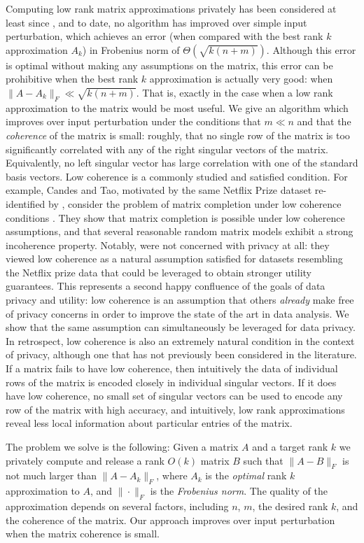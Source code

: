\documentclass[letterpaper,11pt]{article}
\theoremstyle{definition}
\begin{document}
Computing low rank matrix approximations privately has been considered at
least since \cite{BlumDMN05}, and to date, no algorithm has improved over simple
input  perturbation, which achieves an error (when compared with the best rank
$k$ approximation $A_k$) in Frobenius norm of $\Theta(\sqrt{k(n + m)})$. Although this error is optimal without making any assumptions on the matrix, this
error can be prohibitive when the best rank $k$ approximation is actually very
good: when $\|A-A_k\|_F \ll \sqrt{k(n+m)}.$ That is, exactly in the case when a
low rank approximation to the matrix would be most useful.  We give an
algorithm which improves over input perturbation under the conditions that $m
\ll n$ and that the \emph{coherence} of the matrix is small: roughly, that no
single row of the matrix is too significantly correlated with any of the right singular
vectors of the matrix. Equivalently, no left singular vector has large
correlation with one of the standard basis vectors. Low coherence is a
commonly studied and satisfied condition. For example, Candes and Tao,
motivated by the same Netflix Prize dataset re-identified by
\cite{NarayananS08}, consider the problem of matrix completion under low
coherence conditions \cite{CandesT10}. They show that matrix completion is
possible under low coherence assumptions, and that several reasonable random
matrix models exhibit a strong incoherence property.  Notably, \cite{CandesT10}
were not concerned with privacy at all: they viewed low coherence as a natural
assumption satisfied for datasets resembling the Netflix prize data that could
be leveraged to obtain stronger utility guarantees. This represents a second
happy confluence of the goals of data privacy and utility: low coherence is an
assumption that others \emph{already} make free of privacy concerns
in order to improve the state of the art in data analysis.  We show that the
same assumption can simultaneously be leveraged for data privacy. In
retrospect, low coherence is also an extremely natural condition in the
context of privacy, although one that has not previously been considered in
the literature. If a matrix fails to have low coherence, then intuitively the
data of individual rows of the matrix is encoded closely in individual
singular vectors. If it does have low coherence, no small set of singular
vectors can be used to encode any row of the matrix with high accuracy, and
intuitively, low rank approximations reveal less local information about
particular entries of the matrix.

The problem we solve is the following: Given a matrix $A$ and a target rank
$k$ we privately compute and release a rank $O(k)$ matrix $B$ such that
$\|A-B\|_F$ is not much larger than $\|A-A_k\|_F$, where $A_k$ is the
\emph{optimal} rank $k$ approximation to $A$, and $\|\cdot\|_F$ is the
\emph{Frobenius norm}. The quality of the approximation depends on several
factors, including $n$, $m$, the desired rank $k$, and the coherence of the
matrix. Our approach improves over input perturbation when the matrix
coherence is small.
\end{document}
